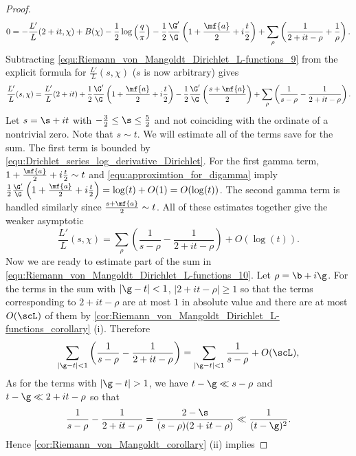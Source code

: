 \begin{proof}
\begin{equation}
          0 = -\frac{L'}{L}(2+it,\chi)+B(\chi)-\frac{1}{2}\log\left(\frac{q}{\pi}\right)-\frac{1}{2}\frac{\G'}{\G}\left(1+\frac{\mf{a}}{2}+i\frac{t}{2}\right)+\sum_{\rho}\left(\frac{1}{2+it-\rho}+\frac{1}{\rho}\right).
        \end{equation}
        Subtracting \cref{equ:Riemann_von_Mangoldt_Dirichlet_L-functions_9} from the explicit formula for $\frac{L'}{L}(s,\chi)$ ($s$ is now arbitrary) gives
        \[
          \frac{L'}{L}(s,\chi) = \frac{L'}{L}(2+it)+\frac{1}{2}\frac{\G'}{\G}\left(1+\frac{\mf{a}}{2}+i\frac{t}{2}\right)-\frac{1}{2}\frac{\G'}{\G}\left(\frac{s+\mf{a}}{2}\right)+\sum_{\rho}\left(\frac{1}{s-\rho}-\frac{1}{2+it-\rho}\right).
        \]
        Let $s = \s+it$ with $-\frac{3}{2} \le \s \le \frac{5}{2}$ and not coinciding with the ordinate of a nontrivial zero. Note that $s \sim t$. We will estimate all of the terms save for the sum. The first term is bounded by \cref{equ:Drichlet_series_log_derivative_Dirichlet}. For the first gamma term, $1+\frac{\mf{a}}{2}+i\frac{t}{2} \sim t$ and \cref{equ:approximtion_for_digamma} imply $\frac{1}{2}\frac{\G'}{\G}\left(1+\frac{\mf{a}}{2}+i\frac{t}{2}\right) = \log(t)+O(1) = O(\log(t))$. The second gamma term is handled similarly since $\frac{s+\mf{a}}{2} \sim t$. All of these estimates together give the weaker asymptotic
        \begin{equation}\label{equ:Riemann_von_Mangoldt_Dirichlet_L-functions_10}
          \frac{L'}{L}(s,\chi) = \sum_{\rho}\left(\frac{1}{s-\rho}-\frac{1}{2+it-\rho}\right)+O(\log(t)).
        \end{equation}
        Now we are ready to estimate part of the sum in \cref{equ:Riemann_von_Mangoldt_Dirichlet_L-functions_10}. Let $\rho = \b+i\g$. For the terms in the sum with $|\g-t| < 1$, $|2+it-\rho| \ge 1$ so that the terms corresponding to $2+it-\rho$ are at most $1$ in absolute value and there are at most $O(\scL)$ of them by \cref{cor:Riemann_von_Mangoldt_Dirichlet_L-functions_corollary} (i). Therefore
        \begin{equation}\label{equ:Riemann_von_Mangoldt_Dirichlet_L-functions_11}
          \sum_{|\g-t| < 1}\left(\frac{1}{s-\rho}-\frac{1}{2+it-\rho}\right) = \sum_{|\g-t| < 1}\frac{1}{s-\rho}+O(\scL),
        \end{equation}
        As for the terms with $|\g-t| > 1$, we have $t-\g \ll s-\rho$ and $t-\g \ll 2+it-\rho$ so that
        \[
          \frac{1}{s-\rho}-\frac{1}{2+it-\rho} = \frac{2-\s}{(s-\rho)(2+it-\rho)} \ll \frac{1}{(t-\g)^{2}}.
        \]
        Hence \cref{cor:Riemann_von_Mangoldt_corollary} (ii) implies

\end{proof}
